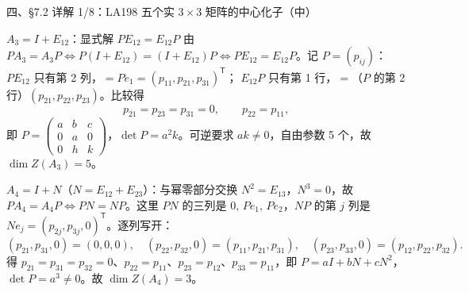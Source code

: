 \documentclass[aspectratio=169,10pt,fontset=none]{ctexbeamer}
\begin{document}
\begin{frame}[t]{四、\S7.2 详解 1/8：LA198 五个实 $3\times3$ 矩阵的中心化子（中）}
\scriptsize
\begin{block}{\footnotesize $A_3=I+E_{12}$：显式解 $PE_{12}=E_{12}P$}
由 $PA_3=A_3P\iff P(I+E_{12})=(I+E_{12})P\iff PE_{12}=E_{12}P$。记 $P=(p_{ij})$：
$PE_{12}$ 只有第 2 列，$=Pe_1=(p_{11},p_{21},p_{31})^{\mathsf T}$；
$E_{12}P$ 只有第 1 行，$=$（$P$ 的第 2 行）$(p_{21},p_{22},p_{23})$。比较得
\[
p_{21}=p_{23}=p_{31}=0,\qquad p_{22}=p_{11},
\]
即 $P=\begin{pmatrix}a&b&c\\0&a&0\\0&h&k\end{pmatrix}$，$\det P=a^2k$。可逆要求 $ak\ne0$，自由参数 5 个，故 $\dim Z(A_3)=5$。
\end{block}
\begin{block}{\footnotesize $A_4=I+N$（$N=E_{12}+E_{23}$）：与幂零部分交换}
$N^2=E_{13}$，$N^3=0$，故 $PA_4=A_4P\iff PN=NP$。这里 $PN$ 的三列是 $0,\,Pe_1,\,Pe_2$，$NP$ 的第 $j$ 列是 $Ne_j=(p_{2j},p_{3j},0)^{\mathsf T}$。逐列写开：
\[
(p_{21},p_{31},0)=(0,0,0),\quad
(p_{22},p_{32},0)=(p_{11},p_{21},p_{31}),\quad
(p_{23},p_{33},0)=(p_{12},p_{22},p_{32}).
\]
得 $p_{21}=p_{31}=p_{32}=0$、$p_{22}=p_{11}$、$p_{23}=p_{12}$、$p_{33}=p_{11}$，即 $P=aI+bN+cN^2$，$\det P=a^3\ne0$。故 $\dim Z(A_4)=3$。
\end{block}
\end{frame}
\end{document}

